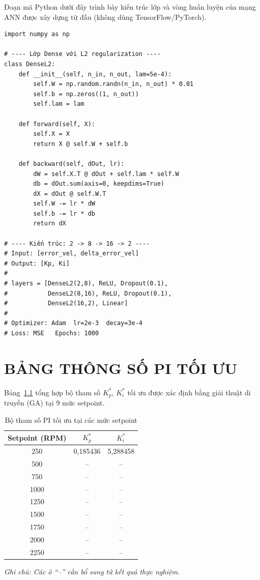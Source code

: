 Đoạn mã Python dưới đây trình bày kiến trúc lớp và vòng huấn luyện của
mạng ANN được xây dựng từ đầu (không dùng TensorFlow/PyTorch).

\begin{verbatim}
import numpy as np

# ---- Lớp Dense với L2 regularization ----
class DenseL2:
    def __init__(self, n_in, n_out, lam=5e-4):
        self.W = np.random.randn(n_in, n_out) * 0.01
        self.b = np.zeros((1, n_out))
        self.lam = lam

    def forward(self, X):
        self.X = X
        return X @ self.W + self.b

    def backward(self, dOut, lr):
        dW = self.X.T @ dOut + self.lam * self.W
        db = dOut.sum(axis=0, keepdims=True)
        dX = dOut @ self.W.T
        self.W -= lr * dW
        self.b -= lr * db
        return dX

# ---- Kiến trúc: 2 -> 8 -> 16 -> 2 ----
# Input: [error_vel, delta_error_vel]
# Output: [Kp, Ki]
#
# layers = [DenseL2(2,8), ReLU, Dropout(0.1),
#           DenseL2(8,16), ReLU, Dropout(0.1),
#           DenseL2(16,2), Linear]
#
# Optimizer: Adam  lr=2e-3  decay=3e-4
# Loss: MSE   Epochs: 1000
\end{verbatim}


\chapter{BẢNG THÔNG SỐ PI TỐI ƯU}
\label{app:pi_table}

Bảng~\ref{tab:pi_optimal} tổng hợp bộ tham số $K_p^*$, $K_i^*$ tối ưu
được xác định bằng giải thuật di truyền (GA) tại 9 mức setpoint.

\begin{table}[H]
\centering
\caption{Bộ tham số PI tối ưu tại các mức setpoint}
\label{tab:pi_optimal}
\renewcommand{\arraystretch}{1.3}
\begin{tabular}{|c|c|c|}
\hline
\textbf{Setpoint (RPM)} & \textbf{$K_p^*$} & \textbf{$K_i^*$} \\
\hline
250  & 0,185436 & 5,288458 \\
500  & --       & --       \\
750  & --       & --       \\
1000 & --       & --       \\
1250 & --       & --       \\
1500 & --       & --       \\
1750 & --       & --       \\
2000 & --       & --       \\
2250 & --       & --       \\
\hline
\end{tabular}

\vspace{0.3cm}
\textit{Ghi chú: Các ô ``--'' cần bổ sung từ kết quả thực nghiệm.}
\end{table}


